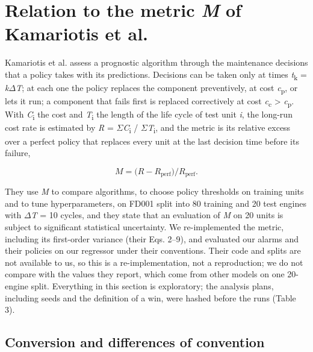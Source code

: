 \documentclass[a4paper,fleqn,doubleblind]{cas-dc}
\begin{document}
\section{Relation to the metric \textit{M} of Kamariotis et al.}\label{sec:7}

Kamariotis et al. \cite{kamariotis2024} assess a prognostic algorithm through the maintenance decisions that a policy takes with its predictions. Decisions can be taken only at times \textit{t}\textsubscript{k} = \textit{k}$\Delta$\textit{T}; at each one the policy replaces the component preventively, at cost \textit{c}\textsubscript{p}, or lets it run; a component that fails first is replaced correctively at cost \textit{c}\textsubscript{c} > \textit{c}\textsubscript{p}. With \textit{C}\textsubscript{i} the cost and \textit{T}\textsubscript{i} the length of the life cycle of test unit \textit{i}, the long-run cost rate is estimated by \textit{R} = $\Sigma$\textit{C}\textsubscript{i} / $\Sigma$\textit{T}\textsubscript{i}, and the metric is its relative excess over a perfect policy that replaces every unit at the last decision time before its failure,

\begin{equation}
M = \bigl( R - R_{\mathrm{perf}} \bigr) / R_{\mathrm{perf}}.
\end{equation}

They use \textit{M} to compare algorithms, to choose policy thresholds on training units and to tune hyperparameters, on FD001 split into 80 training and 20 test engines with $\Delta$\textit{T} = 10 cycles, and they state that an evaluation of \textit{M} on 20 units is subject to significant statistical uncertainty. We re-implemented the metric, including its first-order variance (their Eqs. 2--9), and evaluated our alarms and their policies on our regressor under their conventions. Their code and splits are not available to us, so this is a re-implementation, not a reproduction; we do not compare with the values they report, which come from other models on one 20-engine split. Everything in this section is exploratory; the analysis plans, including seeds and the definition of a win, were hashed before the runs (Table 3).

\subsection{Conversion and differences of convention}
\end{document}
